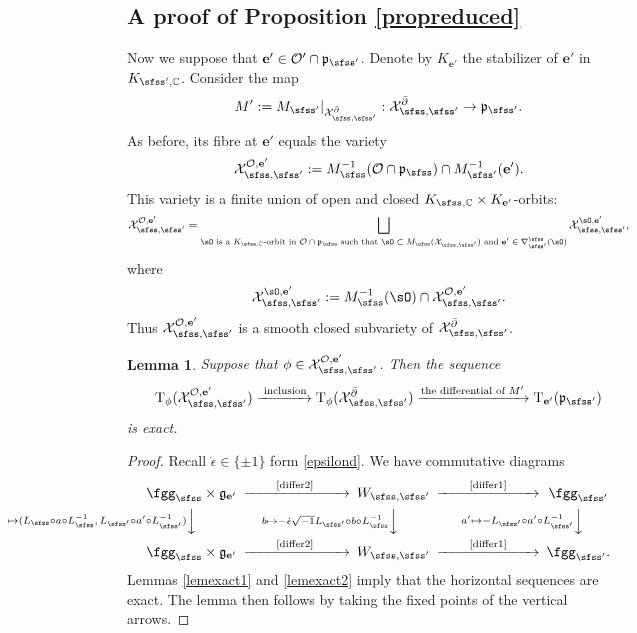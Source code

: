 \documentclass[12pt,a4paper]{amsart}
\newcommand{\CO}{{\mathcal {O}}}
\newcommand{\CX}{{\mathcal {X}}}
\newcommand{\g}{\mathfrak g}
\newcommand{\p}{\mathfrak p}
\newcommand{\be}{\begin {equation}}
\newcommand{\ee}{\end {equation}}
\numberwithin{equation}{section}
\newtheorem{lem}[thm]{Lemma}
\theoremstyle{remark}
\begin{document}
\subsection{A proof of Proposition \ref{propreduced}} \label{secpp}
Now we suppose that $\mathbf e'\in \CO'\cap \p_{\sfss'}$. Denote by $K_{\mathbf e'}$ the stabilizer of $\mathbf e'$ in $K_{\sfss',\C}$. Consider the map
\[
 M':=  M_{\sfss'}|_{\CX_{\sfss, \sfss'}^{\bar \partial}} : \CX_{\sfss, \sfss'}^{\bar \partial}\rightarrow \p_{\sfss'}.
\]
As before, its fibre at $\mathbf e'$ equals the variety
\[
\CX_{\sfss, \sfss'}^{\CO, \mathbf e'}:=M_{\sfss}^{-1}(\CO\cap \p_\sfss)\cap  M_{\sfss'}^{-1}(\mathbf e').
\]
This variety is a finite union of open and closed
$K_{\sfss,\C}\times K_{\mathbf e'}$-orbits:
\[
   \CX_{\sfss, \sfss'}^{\CO, \mathbf e'}=\bigsqcup_{\sO\textrm{ is a   $K_{\sfss, \C}$-orbit in $ \CO\cap \p_\sfss$ such that $\sO\subset M_\sfss(\CX_{\sfss, \sfss'})$ and $\mathbf e'\in \nabla^\sfss_{\sfss'}(\sO)$}}  \CX_{\sfss, \sfss'}^{\sO, \mathbf e'},
 \]
 where
 \[
   \CX_{\sfss, \sfss'}^{\sO, \mathbf e'}:=M_\sfss^{-1}(\sO)\cap \CX_{\sfss, \sfss'}^{\CO, \mathbf e'}.
 \]
Thus  $\CX_{\sfss, \sfss'}^{\CO, \mathbf e'}$ is a smooth closed subvariety of $\CX_{\sfss, \sfss'}^{\bar \partial}$.

\begin{lem}\label{jacobic22}
Suppose that  $\phi\in \CX_{\sfss, \sfss'}^{\CO, \mathbf e'}$. Then the sequence
\be\label{jc111}
    \mathrm T_\phi (\CX_{\sfss, \sfss'}^{\CO, \mathbf e'})\xrightarrow{\textrm{ inclusion}} \mathrm T_\phi(\CX_{\sfss, \sfss'}^{\bar \partial})\xrightarrow{\textrm{the differential of $M'$}} \mathrm T_{\mathbf e'}(\p_{\sfss'})
\ee
is exact.
\end{lem}
\begin{proof}
Recall $\dot \epsilon\in \{\pm 1\}$ form \eqref{epsilond}. We have commutative diagrams
\[
 \begin{CD}
 \fggs \times  \g_{\mathbf e'} @>  \qquad  \textrm{\eqref{differ2} }\qquad  >>  W_{\sfss, \sfss'}
  @> \qquad  \textrm{\eqref{differ1}} \qquad  >>\fggsp\\
  @V(a,\,a') \mapsto  (L_\sfss\circ a \circ L_{\sfss}^{-1},\,  L_{\sfss'} \circ a' \circ L_{\sfss'}^{-1}) VV  @V b\mapsto - \dot \epsilon \sqrt{-1} L_{\sfss'}\circ b \circ L_\sfss^{-1} VV
  @V a' \mapsto - L_{\sfss'} \circ a' \circ L_{\sfss'}^{-1} VV \\
\fggs \times  \g_{\mathbf e'} @> \qquad   \textrm{\eqref{differ2} }\qquad  >>  W_{\sfss, \sfss'}
  @>\qquad  \textrm{\eqref{differ1}} \qquad  >> \fggsp.
\end{CD}
\]
Lemmas \ref{lemexact1} and \ref{lemexact2} imply that the horizontal sequences are exact. The lemma then follows by taking the fixed points of the vertical arrows.

\end{proof}
\end{document}
